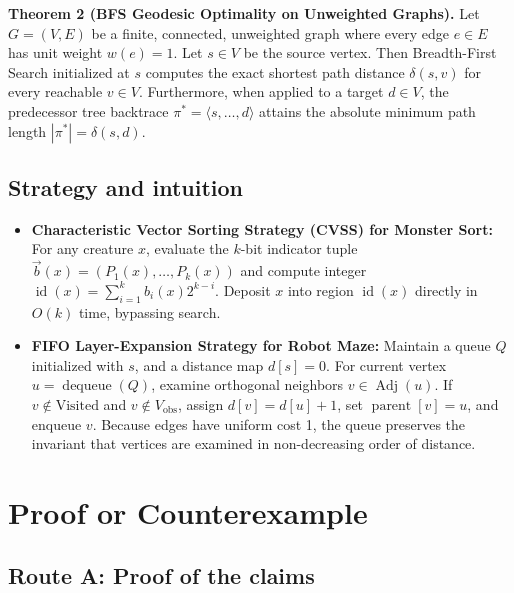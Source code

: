 \documentclass[11pt,a4paper]{article}
\begin{document}
\textbf{Theorem 2 (BFS Geodesic Optimality on Unweighted Graphs).}
Let $G = (V, E)$ be a finite, connected, unweighted graph where every edge $e \in E$ has unit weight $w(e) = 1$. Let $s \in V$ be the source vertex. Then Breadth-First Search initialized at $s$ computes the exact shortest path distance $\delta(s, v)$ for every reachable $v \in V$. Furthermore, when applied to a target $d \in V$, the predecessor tree backtrace $\pi^* = \langle s, \dots, d \rangle$ attains the absolute minimum path length $|\pi^*| = \delta(s, d)$.

\subsection{Strategy and intuition}
\begin{itemize}
  \item \textbf{Characteristic Vector Sorting Strategy (CVSS) for Monster Sort:} For any creature $x$, evaluate the $k$-bit indicator tuple $\vec{b}(x) = (P_1(x), \dots, P_k(x))$ and compute integer $\operatorname{id}(x) = \sum_{i=1}^k b_i(x) 2^{k-i}$. Deposit $x$ into region $\operatorname{id}(x)$ directly in $O(k)$ time, bypassing search.
  \item \textbf{FIFO Layer-Expansion Strategy for Robot Maze:} Maintain a queue $Q$ initialized with $s$, and a distance map $d[s] = 0$. For current vertex $u = \operatorname{dequeue}(Q)$, examine orthogonal neighbors $v \in \operatorname{Adj}(u)$. If $v \notin \text{Visited}$ and $v \notin V_{\text{obs}}$, assign $d[v] = d[u] + 1$, set $\operatorname{parent}[v] = u$, and enqueue $v$. Because edges have uniform cost 1, the queue preserves the invariant that vertices are examined in non-decreasing order of distance.
\end{itemize}

\newpage
\section{Proof or Counterexample}

\subsection*{Route A: Proof of the claims}
\end{document}
